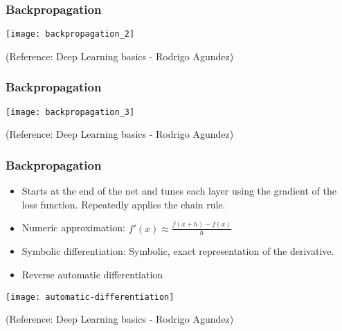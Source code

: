 \begin{frame}[fragile] \frametitle{Backpropagation}

\begin{center}
\texttt{[image: backpropagation\_2]}

\end{center}

\tiny{(Reference: Deep Learning basics - Rodrigo Agundez)}

\end{frame}

\begin{frame}[fragile] \frametitle{Backpropagation}

\begin{center}
\texttt{[image: backpropagation\_3]}

\end{center}

\tiny{(Reference: Deep Learning basics - Rodrigo Agundez)}

\end{frame}

\begin{frame}[fragile] \frametitle{Backpropagation}


\begin{itemize}
\item Starts at the end of the net and tunes each layer using the gradient of the loss function. Repeatedly applies the chain rule. 

\item Numeric approximation: $f'(x) \approx \frac{f(x+h) - f(x)}{h}$

\item Symbolic differentiation: Symbolic, exact representation of the derivative.

\item Reverse automatic differentiation
\end{itemize}


\begin{center}
\texttt{[image: automatic-differentiation]}
\end{center}

\tiny{(Reference: Deep Learning basics - Rodrigo Agundez)}

\end{frame}

